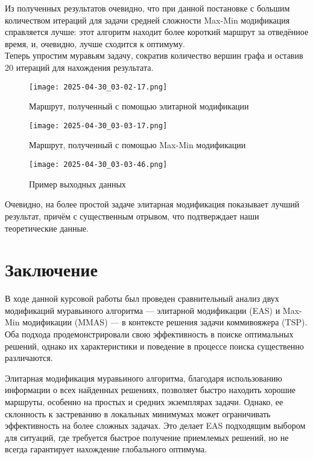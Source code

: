\documentclass[14pt]{article}
\begin{document}
Из полученных результатов очевидно, что при данной постановке с большим количеством итераций для задачи средней сложности Max-Min модификация справляется лучше: этот алгоритм находит более короткий маршрут за отведённое время, и, очевидно, лучше сходится к оптимуму.\\

Теперь упростим муравьям задачу, сократив количество вершин графа и оставив 20 итераций для нахождения результата.

\begin{figure}[H]
    \centering
    \texttt{[image: 2025-04-30\_03-02-17.png]}
    \caption{Маршрут, полученный с помощью элитарной модификации}
    \label{fig:enter-label}
\end{figure}

\begin{figure}[H]
    \centering
    \texttt{[image: 2025-04-30\_03-03-17.png]}
    \caption{Маршрут, полученный с помощью Max-Min модификации}
    \label{fig:enter-label}
\end{figure}

\begin{figure}[H]
    \centering
    \texttt{[image: 2025-04-30\_03-03-46.png]}
    \caption{Пример выходных данных}
    \label{fig:enter-label}
\end{figure}

Очевидно, на более простой задаче элитарная модификация показывает лучший результат, причём с существенным отрывом, что подтверждает наши теоретические данные.

\section{Заключение}

В ходе данной курсовой работы был проведен сравнительный анализ двух модификаций муравьиного алгоритма — элитарной модификации (EAS) и Max-Min модификации (MMAS) — в контексте решения задачи коммивояжера (TSP). Оба подхода продемонстрировали свою эффективность в поиске оптимальных решений, однако их характеристики и поведение в процессе поиска существенно различаются.

Элитарная модификация муравьиного алгоритма, благодаря использованию информации о всех найденных решениях, позволяет быстро находить хорошие маршруты, особенно на простых и средних экземплярах задачи. Однако, ее склонность к застреванию в локальных минимумах может ограничивать эффективность на более сложных задачах. Это делает EAS подходящим выбором для ситуаций, где требуется быстрое получение приемлемых решений, но не всегда гарантирует нахождение глобального оптимума.
\end{document}

